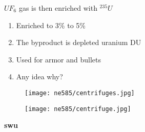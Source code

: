\documentclass[aspectratio=1610,pdftex,dvipsnames,compress,xcolor={dvipsnames}]{beamer}
\newcommand{\acf}{\acrfull} %
\begin{document}
\addtocounter{framenumber}{-1} 
\begin{frame}{$UF_6$ gas is then enriched with $^{235}U$}
    \begin{enumerate}[series=outerlist,topsep=0pt,itemsep=21pt,leftmargin=*,label=(\arabic*)]
        \item[]Enriched to 3\% to 5\%
        \item[]The byproduct is depleted uranium DU
        \item[]Used for armor and bullets
        \item[]Any idea why?
    \end{enumerate}
\end{frame}


\begin{frame}{}
    \begin{figure}
        \centering
        \texttt{[image: ne585/centrifuges.jpg]}
    \end{figure}
\end{frame}


\begin{frame}{}
    \begin{figure}
        \centering
        \texttt{[image: ne585/centrifuge.jpg]}
    \end{figure}
\end{frame}


\begin{frame}[plain]{}
    \centering\LARGE\textbf{\acf{swu}}
\end{frame}
\end{document}
